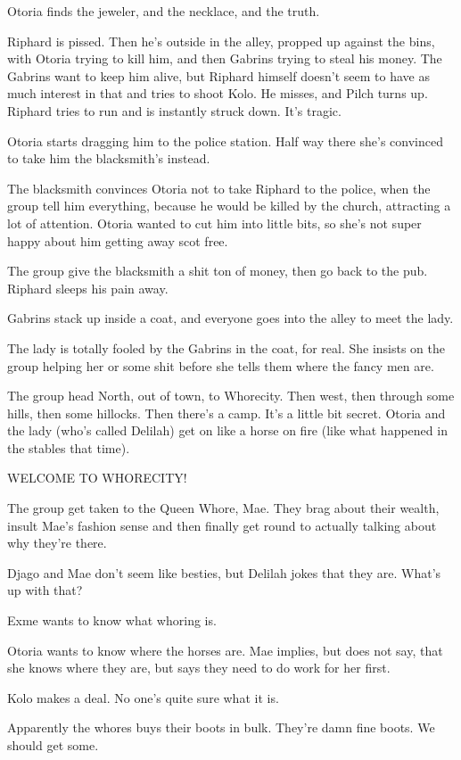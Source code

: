 Otoria finds the jeweler, and the necklace, and the truth.

Riphard is pissed. Then he’s outside in the alley, propped up against the bins, with Otoria trying to kill him, and then Gabrins trying to steal his money. The Gabrins want to keep him alive, but Riphard himself doesn’t seem to have as much interest in that and tries to shoot Kolo. He misses, and Pilch turns up. Riphard tries to run and is instantly struck down. It’s tragic.

Otoria starts dragging him to the police station. Half way there she’s convinced to take him the blacksmith’s instead.

The blacksmith convinces Otoria not to take Riphard to the police, when the group tell him everything, because he would be killed by the church, attracting a lot of attention. Otoria wanted to cut him into little bits, so she’s not super happy about him getting away scot free.

The group give the blacksmith a shit ton of money, then go back to the pub. Riphard sleeps his pain away.

Gabrins stack up inside a coat, and everyone goes into the alley to meet the lady.

The lady is totally fooled by the Gabrins in the coat, for real. She insists on the group helping her or some shit before she tells them where the fancy men are.

The group head North, out of town, to Whorecity. Then west, then through some hills, then some hillocks. Then there’s a camp. It’s a little bit secret. Otoria and the lady (who’s called Delilah) get on like a horse on fire (like what happened in the stables that time).

WELCOME TO WHORECITY!

The group get taken to the Queen Whore, Mae. They brag about their wealth, insult Mae’s fashion sense and then finally get round to actually talking about why they’re there.

Djago and Mae don’t seem like besties, but Delilah jokes that they are. What’s up with that?

Exme wants to know what whoring is.

Otoria wants to know where the horses are. Mae implies, but does not say, that she knows where they are, but says they need to do work for her first.

Kolo makes a deal. No one’s quite sure what it is.

Apparently the whores buys their boots in bulk. They’re damn fine boots. We should get some.

